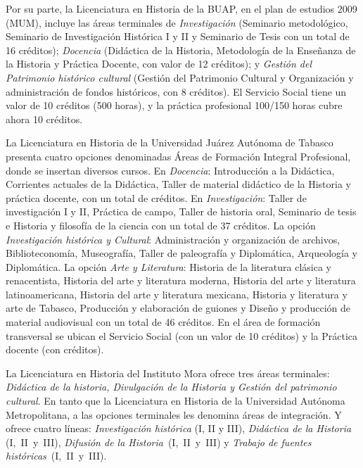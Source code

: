 Por su parte, la Licenciatura en Historia de la BUAP, en el plan de estudios
2009 (MUM), incluye las áreas terminales de \textit{Investigación} (Seminario
metodológico, Seminario de Investigación Histórica I y II y Seminario de
Tesis con un total de 16 créditos); \textit{Docencia} (Didáctica de la
Historia, Metodología de la Enseñanza de la Historia y Práctica Docente, con 
valor de 12 créditos); y \textit{Gestión del Patrimonio histórico cultural} (Gestión
del Patrimonio Cultural y Organización y administración de fondos
históricos, con 8 créditos). El Servicio Social tiene un valor de 10 créditos
(500 horas), y la práctica profesional 100\slash{}150 horas cubre ahora 10 créditos.

La Licenciatura en Historia de la Universidad Juárez Autónoma de Tabasco
presenta cuatro opciones denominadas Áreas de Formación Integral
Profesional, donde se insertan diversos cursos. En \textit{Docencia}:
Introducción a la Didáctica, Corrientes actuales de la Didáctica, Taller de
material didáctico de la Historia y práctica docente, con un total de
créditos. En \textit{Investigación}: Taller de investigación I y II,
Práctica de campo, Taller de historia oral, Seminario de tesis e Historia y
filosofía de la ciencia con un total de 37 créditos. La opción
\textit{Investigación histórica y Cultural}: Administración y organización
de archivos, Biblioteconomía, Museografía, Taller de paleografía y
Diplomática, Arqueología y Diplomática. La opción \textit{Arte y
Literatura}: Historia de la literatura clásica y renacentista, Historia del
arte y literatura moderna, Historia del arte y literatura latinoamericana,
Historia del arte y literatura mexicana, Historia y literatura y arte de
Tabasco, Producción y elaboración de guiones y Diseño y producción de
material audiovisual con un total de 46 créditos. En el área de formación
transversal se ubican el Servicio Social (con un valor de 10 créditos) y la
Práctica docente (con créditos).

\enlargethispage{1\baselineskip}
La Licenciatura en Historia del Instituto Mora ofrece tres áreas terminales:
\textit{Didáctica de la historia, Divulgación de la Historia y Gestión del
patrimonio cultural}. En tanto que la Licenciatura en Historia de la
Universidad Autónoma Metropolitana, a las opciones terminales les denomina áreas
de integración. Y ofrece cuatro líneas: \textit{Investigación histórica}
(I, II y III), \textit{Didáctica de la Historia} (I,~II~y~III),
\textit{Difusión de la Historia}~(I,~II~y~III) y \textit{Trabajo de fuentes
históricas}~(I,~II~y~III).

